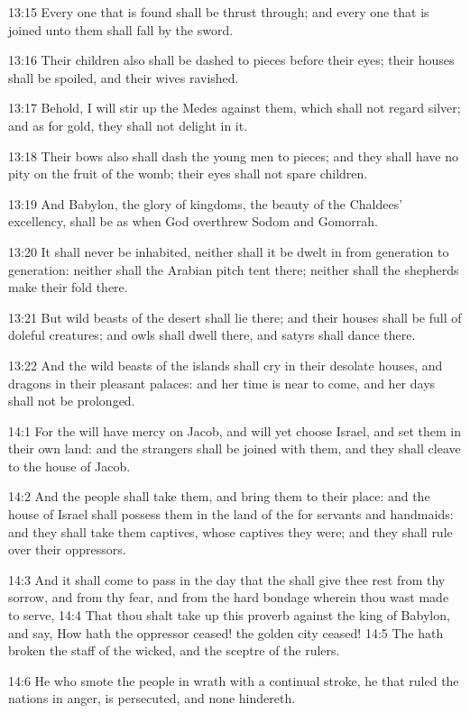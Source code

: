 13:15 Every one that is found shall be thrust through; and every one that is joined unto them shall fall by the sword.

13:16 Their children also shall be dashed to pieces before their eyes; their houses shall be spoiled, and their wives ravished.

13:17 Behold, I will stir up the Medes against them, which shall not regard silver; and as for gold, they shall not delight in it.

13:18 Their bows also shall dash the young men to pieces; and they shall have no pity on the fruit of the womb; their eyes shall not spare children.

13:19 And Babylon, the glory of kingdoms, the beauty of the Chaldees' excellency, shall be as when God overthrew Sodom and Gomorrah.

13:20 It shall never be inhabited, neither shall it be dwelt in from generation to generation: neither shall the Arabian pitch tent there; neither shall the shepherds make their fold there.

13:21 But wild beasts of the desert shall lie there; and their houses shall be full of doleful creatures; and owls shall dwell there, and satyrs shall dance there.

13:22 And the wild beasts of the islands shall cry in their desolate houses, and dragons in their pleasant palaces: and her time is near to come, and her days shall not be prolonged.

14:1 For the \LORD will have mercy on Jacob, and will yet choose Israel, and set them in their own land: and the strangers shall be joined with them, and they shall cleave to the house of Jacob.

14:2 And the people shall take them, and bring them to their place: and the house of Israel shall possess them in the land of the \LORD for servants and handmaids: and they shall take them captives, whose captives they were; and they shall rule over their oppressors.

14:3 And it shall come to pass in the day that the \LORD shall give thee rest from thy sorrow, and from thy fear, and from the hard bondage wherein thou wast made to serve, 14:4 That thou shalt take up this proverb against the king of Babylon, and say, How hath the oppressor ceased! the golden city ceased!  14:5 The \LORD hath broken the staff of the wicked, and the sceptre of the rulers.

14:6 He who smote the people in wrath with a continual stroke, he that ruled the nations in anger, is persecuted, and none hindereth.

